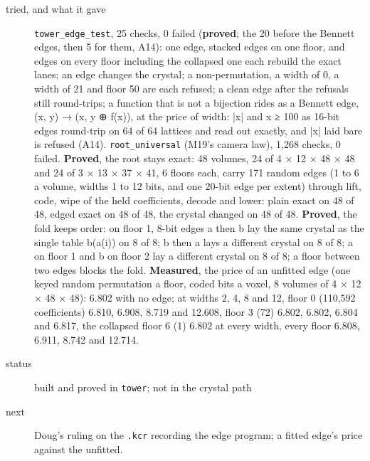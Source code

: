 \begin{description}
\item[{tried, and what it gave}] \texttt{tower\_\allowbreak{}edge\_\allowbreak{}test}, 25 checks, 0 failed (\textbf{proved}; the 20 before the Bennett edges, then 5 for them, A14): one edge, stacked edges on one floor, and edges on every floor including the collapsed one each rebuild the exact lanes; an edge changes the crystal; a non-permutation, a width of 0, a width of 21 and floor 50 are each refused; a clean edge after the refusals still round-trips; a function that is not a bijection rides as a Bennett edge, (x, y) → (x, y ⊕ f(x)), at the price of width: |x| and x ≥ 100 as 16-bit edges round-trip on 64 of 64 lattices and read out exactly, and |x| laid bare is refused (A14). \texttt{root\_\allowbreak{}universal} (M19's camera law), 1,268 checks, 0 failed. \textbf{Proved}, the root stays exact: 48 volumes, 24 of 4 × 12 × 48 × 48 and 24 of 3 × 13 × 37 × 41, 6 floors each, carry 171 random edges (1 to 6 a volume, widths 1 to 12 bits, and one 20-bit edge per extent) through lift, code, wipe of the held coefficients, decode and lower: plain exact on 48 of 48, edged exact on 48 of 48, the crystal changed on 48 of 48. \textbf{Proved}, the fold keeps order: on floor 1, 8-bit edges a then b lay the same crystal as the single table b(a(i)) on 8 of 8; b then a lays a different crystal on 8 of 8; a on floor 1 and b on floor 2 lay a different crystal on 8 of 8; a floor between two edges blocks the fold. \textbf{Measured}, the price of an unfitted edge (one keyed random permutation a floor, coded bits a voxel, 8 volumes of 4 × 12 × 48 × 48): 6.802 with no edge; at widths 2, 4, 8 and 12, floor 0 (110,592 coefficients) 6.810, 6.908, 8.719 and 12.608, floor 3 (72) 6.802, 6.802, 6.804 and 6.817, the collapsed floor 6 (1) 6.802 at every width, every floor 6.808, 6.911, 8.742 and 12.714.
\item[{status}] built and proved in \texttt{tower}; not in the crystal path
\item[{next}] Doug's ruling on the \texttt{.\allowbreak{}kcr} recording the edge program; a fitted edge's price against the unfitted.
\end{description}


